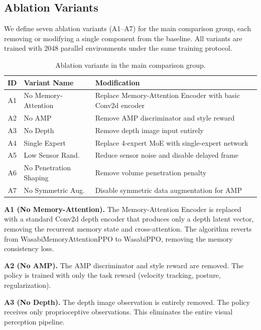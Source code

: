 \subsection{Ablation Variants}
\label{sec:ablation_variants}

We define seven ablation variants (A1--A7) for the main comparison group, each removing or modifying a single component from the baseline. All variants are trained with 2048 parallel environments under the same training protocol.

\begin{table}[t]
\centering
\caption{Ablation variants in the main comparison group.}
\label{tab:ablation_variants}
\footnotesize
\begin{tabular}{@{}cp{3.5cm}p{7cm}@{}}
\toprule
\textbf{ID} & \textbf{Variant Name} & \textbf{Modification} \\
\midrule
A1 & No Memory-Attention & Replace Memory-Attention Encoder with basic Conv2d encoder \\
A2 & No AMP & Remove AMP discriminator and style reward \\
A3 & No Depth & Remove depth image input entirely \\
A4 & Single Expert & Replace 4-expert MoE with single-expert network \\
A5 & Low Sensor Rand. & Reduce sensor noise and disable delayed frame \\
A6 & No Penetration Shaping & Remove volume penetration penalty \\
A7 & No Symmetric Aug. & Disable symmetric data augmentation for AMP \\
\bottomrule
\end{tabular}
\end{table}

\textbf{A1 (No Memory-Attention).} The Memory-Attention Encoder is replaced with a standard Conv2d depth encoder that produces only a depth latent vector, removing the recurrent memory state and cross-attention. The algorithm reverts from WasabiMemoryAttentionPPO to WasabiPPO, removing the memory consistency loss.

\textbf{A2 (No AMP).} The AMP discriminator and style reward are removed. The policy is trained with only the task reward (velocity tracking, posture, regularization).

\textbf{A3 (No Depth).} The depth image observation is entirely removed. The policy receives only proprioceptive observations. This eliminates the entire visual perception pipeline.

